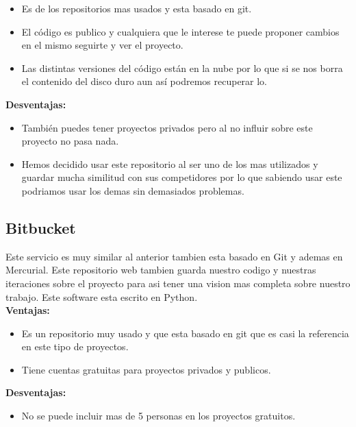 \begin{itemize}
\item Es de los repositorios mas usados y esta basado en git.

\item El código es publico y cualquiera que le interese te puede proponer cambios en el mismo seguirte y ver el proyecto.

\item Las distintas versiones del código están en la nube por lo que si se nos borra el contenido del disco duro aun así podremos recuperar lo.
\end{itemize}

\textbf{Desventajas:}

\begin{itemize}
\item También puedes tener proyectos privados pero al no influir sobre este proyecto no pasa nada.

\item Hemos decidido usar este repositorio al ser uno de los mas utilizados y guardar mucha similitud con sus competidores por lo que sabiendo usar este podriamos usar los demas sin demasiados problemas.
\end{itemize}

\subsection{Bitbucket}
Este servicio es muy similar al anterior tambien esta basado en Git y ademas en Mercurial.
Este repositorio web tambien guarda nuestro codigo y nuestras iteraciones sobre el proyecto para asi tener una vision mas completa sobre nuestro trabajo.
Este software esta escrito en Python.
\\

\textbf{Ventajas:}
\begin{itemize}

\item Es un repositorio muy usado y que esta basado en git que es casi la referencia en este tipo de proyectos.

\item Tiene cuentas gratuitas para proyectos privados y publicos.

\end{itemize}

\textbf{Desventajas:}

\begin{itemize}
\item No se puede incluir mas de 5 personas en los proyectos gratuitos.
\end{itemize}





 